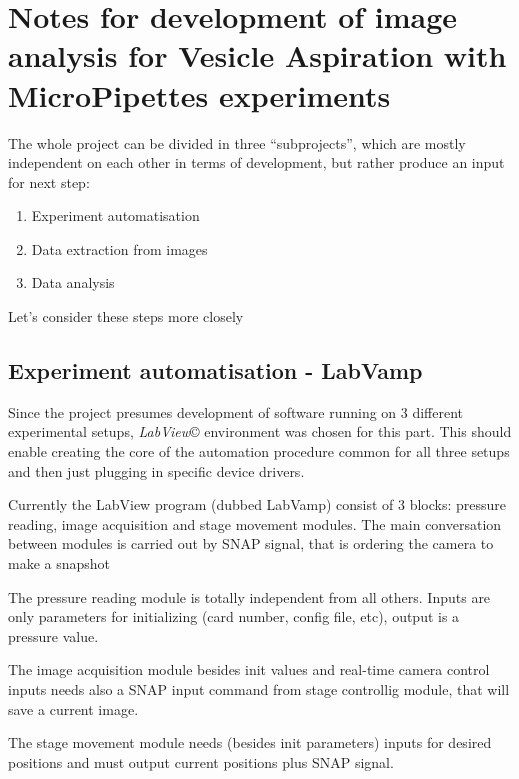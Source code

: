 
\chapter{Notes for development of image analysis for Vesicle Aspiration with MicroPipettes experiments}\label{chap:devnotes}

The whole project can be divided in three ``subprojects'', which are mostly independent on each other in terms of development, but rather produce an input for next step:
\begin{enumerate}
	\item Experiment automatisation
	\item Data extraction from images
	\item Data analysis
\end{enumerate}
Let's consider these steps more closely

\section{Experiment automatisation - LabVamp}\label{experiment}

Since the project presumes development of software running on 3 different experimental setups, \emph{LabView}\copyright{} environment was chosen for this part. This should enable creating the core of the automation procedure common for all three setups and then just plugging in specific device drivers.

Currently the LabView program (dubbed LabVamp) consist of 3 blocks: pressure reading, image acquisition and stage movement modules. The main conversation between modules is carried out by SNAP signal, that is ordering the camera to make a snapshot

The pressure reading module is totally independent from all others. Inputs are only parameters for initializing (card number, config file, etc), output is a pressure value.

The image acquisition module besides init values and real-time camera control inputs needs also a SNAP input command from stage controllig module, that will save a current image.

The stage movement module needs (besides init parameters) inputs for desired positions and must output current positions plus SNAP signal.

